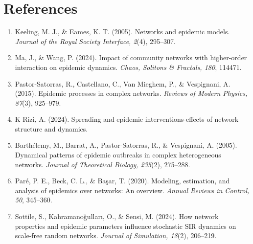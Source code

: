 \documentclass[12pt,a4paper]{article}
\begin{document}
\section*{References}
\begin{enumerate}
    \item Keeling, M. J., \& Eames, K. T. (2005). Networks and epidemic models. \textit{Journal of the Royal Society Interface, 2}(4), 295--307.
    \item Ma, J., \& Wang, P. (2024). Impact of community networks with higher-order interaction on epidemic dynamics. \textit{Chaos, Solitons \& Fractals, 180}, 114471.
    \item Pastor-Satorras, R., Castellano, C., Van Mieghem, P., \& Vespignani, A. (2015). Epidemic processes in complex networks. \textit{Reviews of Modern Physics, 87}(3), 925--979.
    \item K Rizi, A. (2024). Spreading and epidemic interventions-effects of network structure and dynamics.
    \item Barthélemy, M., Barrat, A., Pastor-Satorras, R., \& Vespignani, A. (2005). Dynamical patterns of epidemic outbreaks in complex heterogeneous networks. \textit{Journal of Theoretical Biology, 235}(2), 275--288.
    \item Paré, P. E., Beck, C. L., \& Başar, T. (2020). Modeling, estimation, and analysis of epidemics over networks: An overview. \textit{Annual Reviews in Control, 50}, 345--360.
    \item Sottile, S., Kahramanoğulları, O., \& Sensi, M. (2024). How network properties and epidemic parameters influence stochastic SIR dynamics on scale-free random networks. \textit{Journal of Simulation, 18}(2), 206--219.
\end{enumerate}
\end{document}
